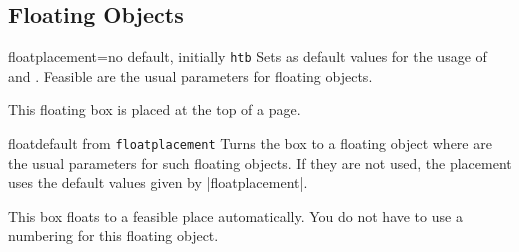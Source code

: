 {\tcbusetemp}




\clearpage
\subsection{Floating Objects}
\begin{docTcbKey}{floatplacement}{=}{no default, initially \texttt{htb}}
  Sets  as default values for the usage of 
  and .
  Feasible are the usual parameters for floating objects.
\begin{dispListing}

\begin{tcolorbox}[floatplacement=t,float,
                  title=Floating box from |floatplacement|,
                  watermark text={I am floating}]
  This floating box is placed at the top of a page.
\end{tcolorbox}
\end{dispListing}
\end{docTcbKey}
{\tcbusetemp}


\begin{docTcbKey}{float}{}{default from \texttt{floatplacement}}
  Turns the box to a floating object where  are the
  usual parameters for such floating objects.
  If they are not used, the placement uses the default values given by
 |floatplacement|.
\begin{dispListing}
\begin{tcolorbox}[float, title=Floating box from |float|,
    enhanced,watermark text={I'm also floating}]
  This box floats to a feasible place automatically. You do not have to
  use a numbering for this floating object.
\end{tcolorbox}
\end{dispListing}
\end{docTcbKey}
{\tcbusetemp}


